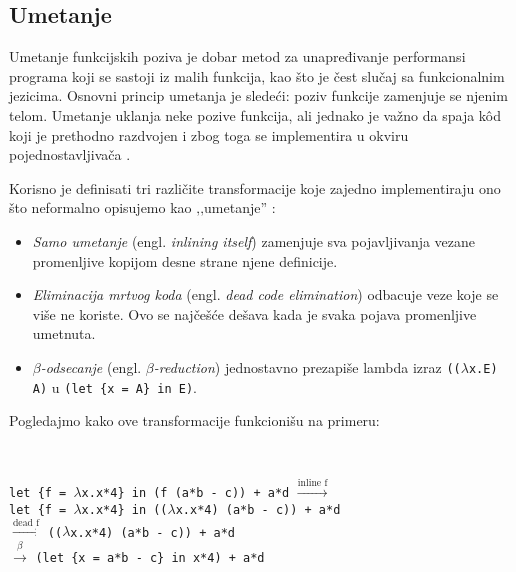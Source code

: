 \subsection{Umetanje}
Umetanje funkcijskih poziva je dobar metod za unapređivanje performansi programa koji se sastoji iz malih funkcija, kao što je čest slučaj sa funkcionalnim jezicima. Osnovni princip umetanja je sledeći: poziv funkcije zamenjuje se njenim telom. Umetanje uklanja neke pozive funkcija, ali jednako je važno da spaja k\^ od koji je prethodno razdvojen i zbog toga se implementira u okviru pojednostavljivača \cite{compilation-by-program-transformation}.

Korisno je definisati tri različite transformacije koje zajedno implementiraju ono što neformalno opisujemo kao ‚‚umetanje'' \cite{secrets-haskell-compiler-inliner, compilation-by-program-transformation}:
\begin{itemize}
	\item \textit{Samo umetanje} (engl. \textit{inlining itself}) zamenjuje sva pojavljivanja vezane promenljive kopijom desne strane njene definicije.
	
	
	\item \textit{Eliminacija mrtvog koda} (engl. \textit{dead code elimination}) odbacuje veze koje se više ne koriste. Ovo se najčešće dešava kada je svaka pojava promenljive umetnuta.
	
	\item \textit{$\beta$-odsecanje} (engl. \textit{$\beta$-reduction}) jednostavno prezapiše lambda izraz \verb|((|$\lambda$\verb|x.E) A)| u \verb|(let {x = A} in E)|. 
\end{itemize}

\noindent Pogledajmo kako ove transformacije funkcionišu na primeru:

\begin{primer} ~
	\begin{center}
		\verb|let {f = |$\lambda$\verb|x.x*4} in (f (a*b - c)) + a*d| 	$\stackrel{\text{inline f}}{\longrightarrow}$ \\
	\verb|let {f = |$\lambda$\verb|x.x*4} in ((|$\lambda$\verb|x.x*4) (a*b - c)) + a*d| \\
		$\stackrel{\text{dead f}}{\longrightarrow}$ \verb|((|$\lambda$\verb|x.x*4) (a*b - c)) + a*d|  \\
		$\stackrel{\beta}{\longrightarrow}$ \verb|(let {x = a*b - c} in x*4) + a*d|
	\end{center}
\end{primer}

